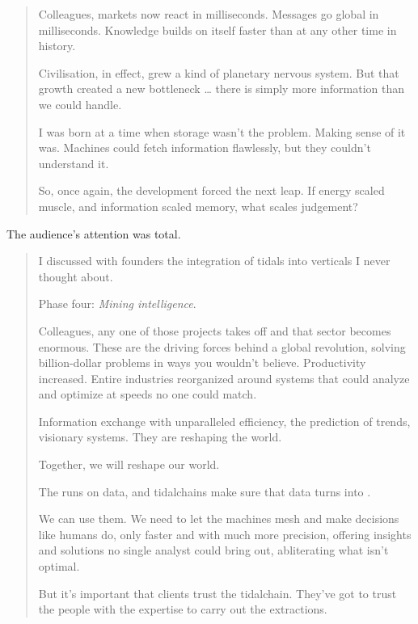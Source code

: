 \begin{quote}
Colleagues, markets now react in milliseconds. Messages go global in milliseconds. Knowledge builds on itself faster than at any other time in history.

\medskip

Civilisation, in effect, grew a kind of planetary nervous system. But that growth created a new bottleneck \ldots{} there is simply more information than we could handle.

\medskip

I was born at a time when storage wasn't the problem. Making sense of it was. Machines could fetch information flawlessly, but they couldn't understand it.

\medskip

So, once again, the development forced the next leap. If energy scaled muscle, and information scaled memory, what scales judgement?

\end{quote}

The audience's attention was total.

\begin{quote}
I discussed with founders the integration of tidals into verticals I never thought about.

Phase four: \textit{Mining intelligence}.

Colleagues, any one of those projects takes off and that sector becomes enormous. These are the driving forces behind a global revolution, solving billion-dollar problems in ways you wouldn't believe. Productivity increased. Entire industries reorganized around systems that could analyze and optimize at speeds no one could match.

Information exchange with unparalleled efficiency, the prediction of trends, visionary systems. They are reshaping the world.

Together, we will reshape our world.

The  runs on data, and tidalchains make sure that data turns into .

We can use them. We need to let the machines mesh and make decisions like humans do, only faster and with much more precision, offering insights and solutions no single analyst could bring out, abliterating what isn't optimal.

But it's important that clients trust the tidalchain. They've got to trust the people with the expertise to carry out the extractions.
\end{quote}

